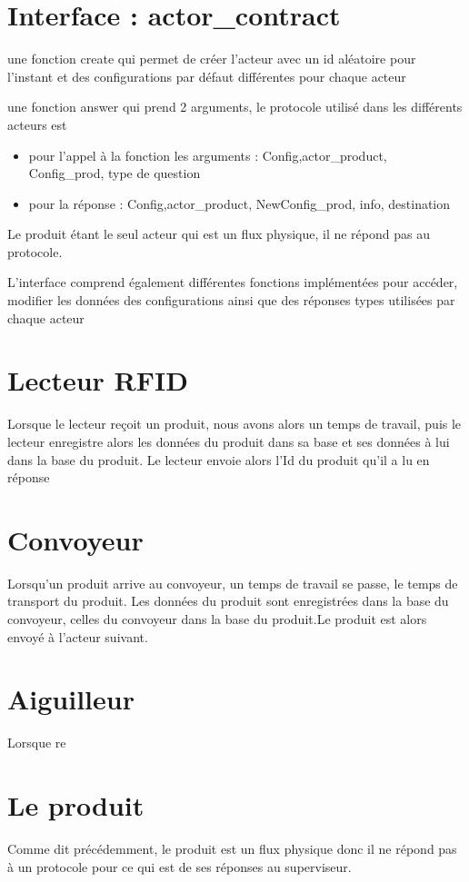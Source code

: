 	\section{Interface : actor_contract}

	 une fonction create qui permet de créer l'acteur avec un id aléatoire pour l'instant et des configurations par défaut différentes pour chaque acteur
	
	 une fonction answer qui prend 2 arguments, le protocole utilisé dans les différents acteurs est 
	\begin{itemize}
	
	 \item pour l'appel à la fonction les arguments : {Config,{actor\_product, Config\_prod, type de 				question}}
	\item pour la réponse : {Config,{actor\_product, NewConfig\_prod, info}, destination}

	\end{itemize}
	 Le produit étant le seul acteur qui est un flux physique, il ne répond pas au protocole. 
	 
	 L'interface comprend également différentes fonctions implémentées pour accéder, modifier les données des configurations ainsi que des réponses types utilisées par chaque acteur
	 
	 \section{Lecteur RFID}
	 Lorsque le lecteur reçoit un produit, nous avons alors un temps de travail, puis le lecteur enregistre alors les données du produit dans sa base et ses données à lui dans la base du produit. Le lecteur envoie alors l'Id du produit qu'il a lu en réponse
	 
	 \section{Convoyeur}
	Lorsqu'un produit arrive au convoyeur, un temps de travail se passe, le temps de transport du produit. Les données du produit sont enregistrées dans la base du convoyeur, celles du convoyeur dans la base du produit.Le produit est alors envoyé à l'acteur suivant.

	\section{Aiguilleur}
	Lorsque re
	 
	 \section{Le produit}
	 
	 Comme dit précédemment, le produit est un flux physique donc il ne répond pas à un protocole pour ce qui est de ses réponses au superviseur. 
	 
